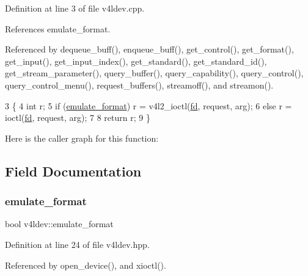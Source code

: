Definition at line 3 of file v4ldev.\+cpp.



References emulate\+\_\+format.



Referenced by dequeue\+\_\+buff(), enqueue\+\_\+buff(), get\+\_\+control(), get\+\_\+format(), get\+\_\+input(), get\+\_\+input\+\_\+index(), get\+\_\+standard(), get\+\_\+standard\+\_\+id(), get\+\_\+stream\+\_\+parameter(), query\+\_\+buffer(), query\+\_\+capability(), query\+\_\+control(), query\+\_\+control\+\_\+menu(), request\+\_\+buffers(), streamoff(), and streamon().


\begin{DoxyCode}
3                                                   \{
4     \textcolor{keywordtype}{int} r;
5     \textcolor{keywordflow}{if} (\hyperlink{classv4ldev_a5edb19bf69f780a3b2bcf1d639ec2a87}{emulate\_format}) r = v4l2\_ioctl(\hyperlink{classv4ldev_a2cd44be3be75a19ab8bec12b28e29142}{fd}, request, arg);
6     \textcolor{keywordflow}{else} r = ioctl(\hyperlink{classv4ldev_a2cd44be3be75a19ab8bec12b28e29142}{fd}, request, arg);
7 
8     \textcolor{keywordflow}{return} r;
9 \}
\end{DoxyCode}
Here is the caller graph for this function\+:


\subsection{Field Documentation}
\mbox{\label{classv4ldev_a5edb19bf69f780a3b2bcf1d639ec2a87}} 
\subsubsection{\texorpdfstring{emulate\+\_\+format}{emulate\_format}}
{\footnotesize\ttfamily bool v4ldev\+::emulate\+\_\+format\hspace{0.3cm}{\ttfamily [private]}}



Definition at line 24 of file v4ldev.\+hpp.



Referenced by open\+\_\+device(), and xioctl().

\mbox{\label{classv4ldev_a2cd44be3be75a19ab8bec12b28e29142}} 
